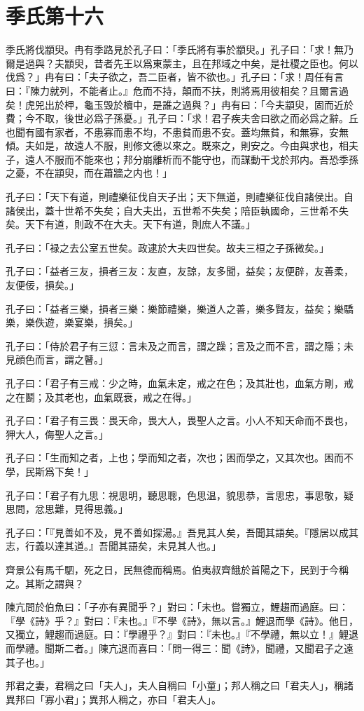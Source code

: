 \section[季氏第十六]{季氏第十六}

季氏將伐顓臾。冉有季路見於孔子曰：「季氏將有事於顓臾。」孔子曰：「求！無乃爾是過與？夫顓臾，昔者先王以爲東蒙主，且在邦域之中矣，是社稷之臣也。何以伐爲？」冉有曰：「夫子欲之，吾二臣者，皆不欲也。」孔子曰：「求！周任有言曰：『陳力就列，不能者止。』危而不持，顛而不扶，則將焉用彼相矣？且爾言過矣！虎兕出於柙，龜玉毁於櫝中，是誰之過與？」冉有曰：「今夫顓臾，固而近於費；今不取，後世必爲子孫憂。」孔子曰：「求！君子疾夫舍曰欲之而必爲之辭。丘也聞有國有家者，不患寡而患不均，不患貧而患不安。蓋均無貧，和無寡，安無傾。夫如是，故遠人不服，則修文德以來之。既來之，則安之。今由與求也，相夫子，遠人不服而不能來也；邦分崩離析而不能守也，而謀動干戈於邦内。吾恐季孫之憂，不在顓臾，而在蕭牆之内也！」

孔子曰：「天下有道，則禮樂征伐自天子出；天下無道，則禮樂征伐自諸侯出。自諸侯出，蓋十世希不失矣；自大夫出，五世希不失矣；陪臣執國命，三世希不失矣。天下有道，則政不在大夫。天下有道，則庶人不議。」

孔子曰：「禄之去公室五世矣。政逮於大夫四世矣。故夫三桓之子孫微矣。」

孔子曰：「益者三友，損者三友：友直，友諒，友多聞，益矣；友便辟，友善柔，友便佞，損矣。」

孔子曰：「益者三樂，損者三樂：樂節禮樂，樂道人之善，樂多賢友，益矣；樂驕樂，樂佚遊，樂宴樂，損矣。」

孔子曰：「侍於君子有三愆：言未及之而言，謂之躁；言及之而不言，謂之隱；未見顔色而言，謂之瞽。」

孔子曰：「君子有三戒：少之時，血氣未定，戒之在色；及其壯也，血氣方剛，戒之在鬭；及其老也，血氣既衰，戒之在得。」

孔子曰：「君子有三畏：畏天命，畏大人，畏聖人之言。小人不知天命而不畏也，狎大人，侮聖人之言。」

孔子曰：「生而知之者，上也；學而知之者，次也；困而學之，又其次也。困而不學，民斯爲下矣！」

孔子曰：「君子有九思：視思明，聽思聰，色思温，貌思恭，言思忠，事思敬，疑思問，忿思難，見得思義。」

孔子曰：「『見善如不及，見不善如探湯。』吾見其人矣，吾聞其語矣。『隱居以成其志，行義以達其道。』吾聞其語矣，未見其人也。」

齊景公有馬千駟，死之日，民無德而稱焉。伯夷叔齊餓於首陽之下，民到于今稱之。其斯之謂與？

陳亢問於伯魚曰：「子亦有異聞乎？」對曰：「未也。嘗獨立，鯉趨而過庭。曰：『學《詩》乎？』對曰：『未也。』『不學《詩》，無以言。』鯉退而學《詩》。他日，又獨立，鯉趨而過庭。曰：『學禮乎？』對曰：『未也。』『不學禮，無以立！』鯉退而學禮。聞斯二者。」陳亢退而喜曰：「問一得三：聞《詩》，聞禮，又聞君子之遠其子也。」

邦君之妻，君稱之曰「夫人」，夫人自稱曰「小童」；邦人稱之曰「君夫人」，稱諸異邦曰「寡小君」；異邦人稱之，亦曰「君夫人」。
